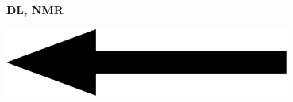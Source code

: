 \documentclass[a4paper]{article}
\begin{document}
\printGenericVSLHeader
\begin{center}
\begin{vsltext}{4cm}{4.5cm}

   \vspace{0.5cm} 

    \textbf{DL, NMR} 

    \vspace{2.5cm}

    \includegraphics[width=0.7\textwidth, keepaspectratio=true]{arrow_left.pdf}

\end{vsltext}

\end{center}
\end{document}
